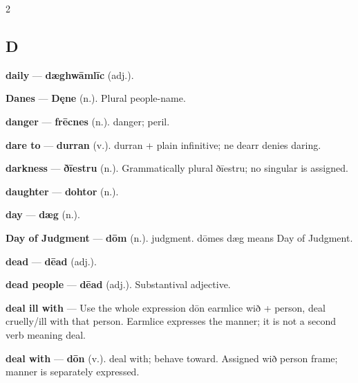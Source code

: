 \begin{multicols}{2}
\subsection*{D}
\textbf{daily} — \textbf{dæghwāmlīc} (adj.).\par
\textbf{Danes} — \textbf{Dęne} (n.). Plural people-name.\par
\textbf{danger} — \textbf{frēcnes} (n.). danger; peril.\par
\textbf{dare to} — \textbf{durran} (v.). durran + plain infinitive; ne dearr denies daring.\par
\textbf{darkness} — \textbf{ðīestru} (n.). Grammatically plural ðīestru; no singular is assigned.\par
\textbf{daughter} — \textbf{dohtor} (n.).\par
\textbf{day} — \textbf{dæg} (n.).\par
\textbf{Day of Judgment} — \textbf{dōm} (n.). judgment. dōmes dæg means Day of Judgment.\par
\textbf{dead} — \textbf{dēad} (adj.).\par
\textbf{dead people} — \textbf{dēad} (adj.). Substantival adjective.\par
\textbf{deal ill with} — Use the whole expression dōn earmlice wið + person, deal cruelly/ill with that person. Earmlice expresses the manner; it is not a second verb meaning deal.\par
\textbf{deal with} — \textbf{dōn} (v.). deal with; behave toward. Assigned wið person frame; manner is separately expressed.\par

\end{multicols}
